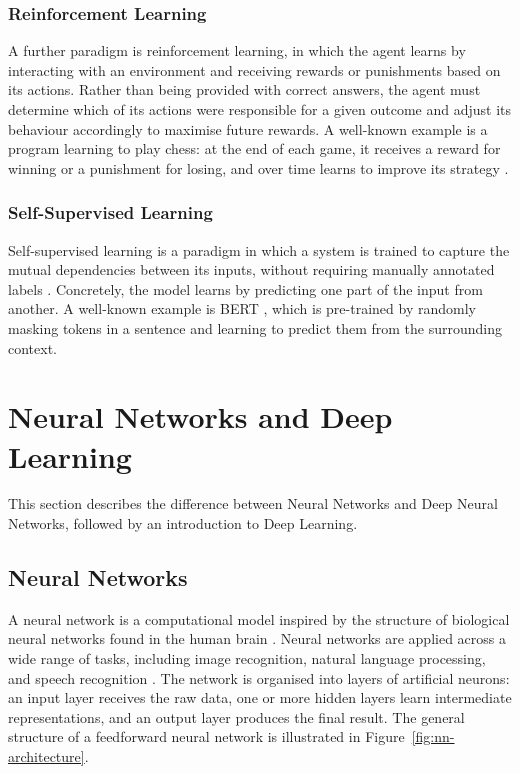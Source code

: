 \subsubsection*{Reinforcement Learning}

A further paradigm is reinforcement learning, in which the agent
learns by interacting with an environment and receiving rewards
or punishments based on its actions. Rather than being provided with correct
answers, the agent must determine which of its actions were responsible for a
given outcome and adjust its behaviour accordingly to maximise future rewards.
A well-known example is a program learning to play chess: at the end of each
game, it receives a reward for winning or a punishment for losing, and over
time learns to improve its strategy \cite{russell2022}.


\subsubsection*{Self-Supervised Learning}

Self-supervised learning is a paradigm in which a system is
trained to capture the mutual dependencies between its inputs,
without requiring manually annotated labels \cite{lecun2022}.
Concretely, the model learns by predicting one part of the
input from another. A well-known example is BERT
  \cite{devlin2019}, which is pre-trained by randomly masking
  tokens in a sentence and learning to predict them from the
  surrounding context.

\section{Neural Networks and Deep Learning}

This section describes the difference between
  Neural Networks and Deep Neural Networks,
  followed by an introduction to Deep Learning.

\subsection{Neural Networks}
\label{sec:neural-networks}

A neural network is a computational model inspired by the structure of
biological neural networks found in the human brain \cite{nielsen2015,
goodfellow2016}. Neural networks are applied across a wide range of
tasks, including image recognition, natural language processing, and
speech recognition \cite{goodfellow2016}. The network is organised into layers of
artificial neurons: an input layer receives the raw
data, one or more hidden layers learn intermediate representations, and
an output layer produces the final result. The general structure of a
feedforward neural network is illustrated in
Figure~\ref{fig:nn-architecture}.

